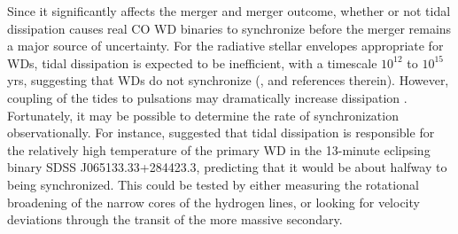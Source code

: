 Since it significantly affects the merger and merger outcome, whether or not tidal dissipation causes real CO WD binaries to synchronize before the merger remains a major source of uncertainty.  For the radiative stellar envelopes appropriate for WDs, tidal dissipation is expected to be inefficient, with a timescale $10^{12}$ to $10^{15}$ yrs, suggesting that WDs do not synchronize (\citealt{marsns04}, and references therein).  However, coupling of the tides to pulsations may dramatically increase dissipation \citep{fulll12}.  Fortunately, it may be possible to determine the rate of synchronization observationally.  For instance, \citet{piro11} suggested that tidal dissipation is responsible for the relatively high temperature of the primary WD in the 13-minute eclipsing binary SDSS J065133.33+284423.3, predicting that it would be about halfway to being synchronized.  This could be tested by either measuring the rotational broadening of the narrow cores of the hydrogen lines, or looking for velocity deviations through the transit of the more massive secondary.



